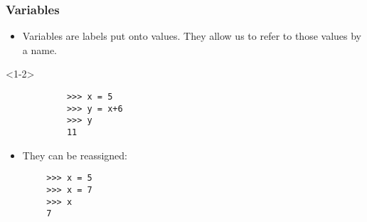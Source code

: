 \documentclass[notes]{beamer}
\begin{document}
	\begin{frame}[fragile]
		\frametitle{Variables}
		\begin{itemize}
			\item Variables are labels put onto values. They allow us to refer to those values by a name.
		\end{itemize}
		
		\begin{onlyenv}
			\begin{lstlisting}
			>>> x = 5
			>>> y = x+6
			>>> y
			11
			\end{lstlisting}
		\end{onlyenv}
		
		\pause
		
		\begin{itemize}
			\item They can be reassigned:
		\end{itemize}
		
		\begin{lstlisting}
		>>> x = 5
		>>> x = 7
		>>> x
		7
		\end{lstlisting}
		
		
	\end{frame}
	
\end{document}
